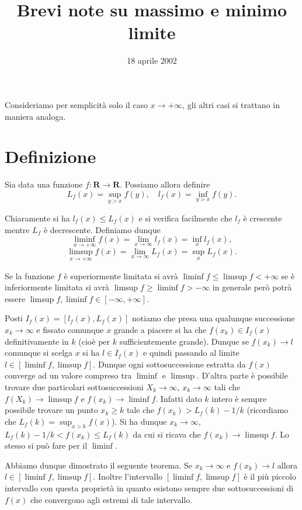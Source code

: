 \documentclass[italian,a4paper]{article}
\title{Brevi note su massimo e minimo limite}
\date{18 aprile 2002}
\newcommand{\R}{\mathbf{R}}
\begin{document}
\maketitle
Consideriamo per semplicit\`a solo il caso $x\to +\infty$, gli altri
casi si trattano in maniera analoga.


\section*{Definizione}

Sia data una funzione $f: \R\to \R$. Possiamo allora definire
\[
L_f(x)=\sup_{y>x} f(y),\quad l_f(x)=\inf_{y>x} f(y).
\]

Chiaramente si ha $l_f(x)\le L_f(x)$ e si verifica facilmente che
$l_f$ \`e crescente mentre $L_f$ \`e decrescente. Definiamo dunque
\[
\liminf_{x\to +\infty} f(x)= \lim_{x\to\infty} l_f(x) = \inf_x l_f(x),
\]
\[
\limsup_{x\to +\infty} f(x)= \lim_{x\to\infty} L_f(x) = \sup_x L_f(x).
\]

Se la funzione $f$ \`e superiormente limitata si avr\`a $\liminf f\le \limsup
f<+\infty$ se \`e inferiormente limitata si avr\`a 
$\limsup f \ge \liminf f>-\infty$
in generale per\`o potr\`a essere $\limsup f,\liminf f \in [-\infty,+\infty]$.

Posti $I_f(x)=[l_f(x),L_f(x)]$ notiamo che presa una qualunque
successione $x_k\to\infty$ e fissato comunque $x$ grande a piacere si
ha che $f(x_k)\in I_f(x)$ definitivamente in $k$ (cio\`e per $k$
sufficientemente grande). Dunque se $f(x_k)\to l$ comunque si scelga $x$ si ha $l\in
I_f(x)$ e quindi passando al limite $l\in [\liminf f,\limsup f]$.
Dunque ogni sottosuccessione estratta da $f(x)$ converge ad un valore
compreso tra $\liminf$ e $\limsup$. D'altra parte \`e possibile
trovare due particolari sottosuccessioni $X_k\to \infty$,
$x_k\to\infty$ tali che $f(X_k)\to \limsup f$ e $f(x_k)\to \liminf
f$. Infatti dato $k$ intero \`e
sempre possibile trovare un punto $x_k\ge k$ tale che
$f(x_k)>L_f(k)-1/k$ (ricordiamo che $L_f(k)=\sup_{x>k} f(x)$). Si ha
dunque $x_k\to \infty$, $L_f(k)-1/k<f(x_k)\le L_f(k)$ da cui si ricava
che $f(x_k)\to \limsup f$. Lo stesso si pu\`o fare per il $\liminf$.

Abbiamo dunque dimostrato il seguente teorema.
Se $x_k\to \infty$ e $f(x_k)\to l$ allora $l\in [\liminf f,\limsup
  f]$. Inoltre l'intervallo $[\liminf f,\limsup f]$ \`e il pi\`u
  piccolo intervallo con questa propriet\`a in quanto esistono sempre
  due sottosuccessioni di $f(x)$ che convergono agli estremi di tale
  intervallo.
\end{document}
